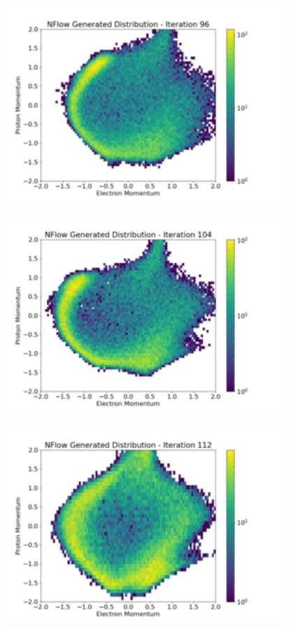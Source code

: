 \documentclass[aspectratio=169]{beamer}
\begin{document}
\begin{frame}[noframenumbering]\centering\includegraphics[width=0.8\textwidth]{images/400training/400training-12.png}\end{frame}
\begin{frame}[noframenumbering]\centering\includegraphics[width=0.8\textwidth]{images/400training/400training-13.png}\end{frame}
\begin{frame}[noframenumbering]\centering\includegraphics[width=0.8\textwidth]{images/400training/400training-14.png}\end{frame}
\end{document}
